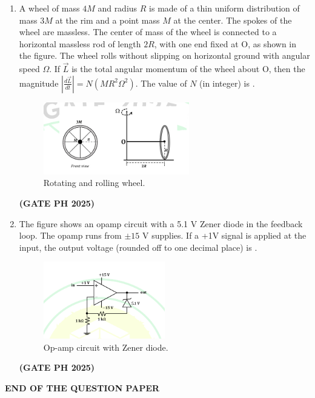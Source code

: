 \documentclass[14pt, a4paper]{extarticle}
\renewcommand{\vec}[1]{\overrightarrow{#1}}
\begin{document}
\begin{enumerate}[label=\textbf{Q.\arabic*}]
\item A wheel of mass $4M$ and radius $R$ is made of a thin uniform distribution of mass $3M$ at the rim and a point mass $M$ at the center. The spokes of the wheel are massless. The center of mass of the wheel is connected to a horizontal massless rod of length $2R$, with one end fixed at O, as shown in the figure. The wheel rolls without slipping on horizontal ground with angular speed $\Omega$. If $\vec{L}$ is the total angular momentum of the wheel about O, then the magnitude $|\frac{d\vec{L}}{dt}| = N(MR^2\Omega^2)$. The value of $N$ (in integer) is \underline{\hspace{3cm}}.
\begin{figure}[H]
\centering
\includegraphics[width=0.6\textwidth]{figs/q64fig25.png}
\caption{Rotating and rolling wheel.}
\label{fig:q64_wheel}
\end{figure}
\hfill \textbf{(GATE PH 2025)}

\item The figure shows an opamp circuit with a 5.1 V Zener diode in the feedback loop. The opamp runs from $\pm 15$ V supplies. If a +1V signal is applied at the input, the output voltage (rounded off to one decimal place) is \underline{\hspace{3cm}}.
\begin{figure}[H]
\centering
\includegraphics[width=0.5\textwidth]{figs/q65fig25.png}
\caption{Op-amp circuit with Zener diode.}
\label{fig:q65_opamp_circuit}
\end{figure}
\hfill \textbf{(GATE PH 2025)}

\end{enumerate}

\begin{center}
\textbf{END OF THE QUESTION PAPER}
\end{center}
\end{document}
